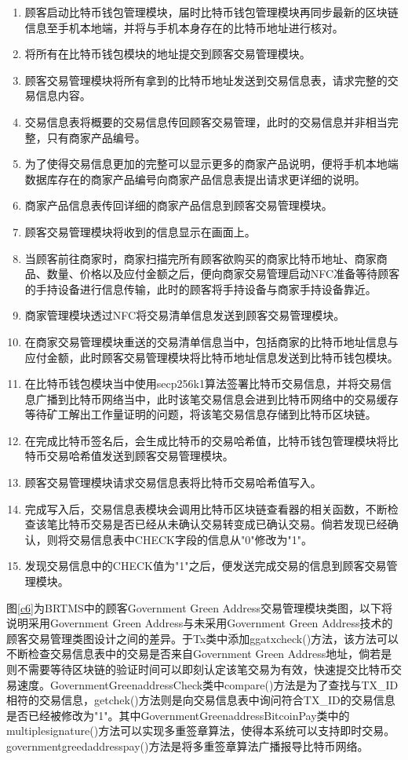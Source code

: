 	\begin{enumerate}
		\item 顾客启动比特币钱包管理模块，届时比特币钱包管理模块再同步最新的区块链信息至手机本地端，并将与手机本身存在的比特币地址进行核对。
		\item 将所有在比特币钱包模块的地址提交到顾客交易管理模块。
		\item 顾客交易管理模块将所有拿到的比特币地址发送到交易信息表，请求完整的交易信息内容。
		\item 交易信息表将概要的交易信息传回顾客交易管理，此时的交易信息并非相当完整，只有商家产品编号。
		\item 为了使得交易信息更加的完整可以显示更多的商家产品说明，便将手机本地端数据库存在的商家产品编号向商家产品信息表提出请求更详细的说明。
		\item 商家产品信息表传回详细的商家产品信息到顾客交易管理模块。
		\item 顾客交易管理模块将收到的信息显示在画面上。
		\item 当顾客前往商家时，商家扫描完所有顾客欲购买的商家比特币地址、商家商品、数量、价格以及应付金额之后，便向商家交易管理启动NFC准备等待顾客的手持设备进行信息传输，此时的顾客将手持设备与商家手持设备靠近。
		\item 商家管理模块透过NFC将交易清单信息发送到顾客交易管理模块。
		\item 在商家交易管理模块重送的交易清单信息当中，包括商家的比特币地址信息与应付金额，此时顾客交易管理模块将比特币地址信息发送到比特币钱包模块。
		\item 在比特币钱包模块当中使用secp256k1算法签署比特币交易信息，并将交易信息广播到比特币网络当中，此时该笔交易信息会进到⽐特币网络中的交易缓存等待矿工解出工作量证明的问题，将该笔交易信息存储到比特币区块链。
		\item 在完成比特币签名后，会生成比特币的交易哈希值，比特币钱包管理模块将比特币交易哈希值发送到顾客交易管理模块。
		\item 顾客交易管理模块请求交易信息表将比特币交易哈希值写入。
		\item 完成写入后，交易信息表模块会调用比特币区块链查看器的相关函数，不断检查该笔比特币交易是否已经从未确认交易转变成已确认交易。倘若发现已经确认，则将交易信息表中CHECK字段的信息从"0"修改为"1"。
		\item 发现交易信息中的CHECK值为"1"之后，便发送完成交易的信息到顾客交易管理模块。
	\end{enumerate}

	图\ref{c6}为BRTMS中的顾客Government Green Address交易管理模块类图，以下将说明采用Government Green Address与未采用Government Green Address技术的顾客交易管理类图设计之间的差异。于Tx类中添加ggatxcheck()方法，该方法可以不断检查交易信息表中的交易是否来自Government Green Address地址，倘若是则不需要等待区块链的验证时间可以即刻认定该笔交易为有效，快速提交比特币交易速度。GovernmentGreenaddressCheck类中compare()方法是为了查找与TX\_ID相符的交易信息，getchek()方法则是向交易信息表中询问符合TX\_ID的交易信息是否已经被修改为"1"。其中GovernmentGreenaddressBitcoinPay类中的multiplesignature()方法可以实现多重签章算法，使得本系统可以支持即时交易。governmentgreedaddresspay()方法是将多重签章算法广播报导比特币网络。


